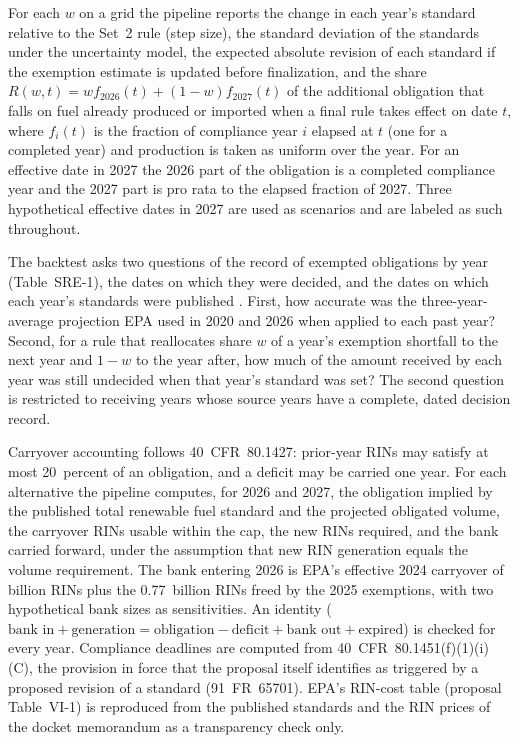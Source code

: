 \documentclass[preprint,12pt,authoryear]{elsarticle}
\begin{document}
For each $w$ on a grid the pipeline reports the change in each year's standard relative to the Set~2 rule (step size), the standard deviation of the standards under the uncertainty model, the expected absolute revision of each standard if the exemption estimate is updated before finalization, and the share $R(w,t) = w f_{2026}(t) + (1-w) f_{2027}(t)$ of the additional obligation that falls on fuel already produced or imported when a final rule takes effect on date $t$, where $f_i(t)$ is the fraction of compliance year $i$ elapsed at $t$ (one for a completed year) and production is taken as uniform over the year. For an effective date in 2027 the 2026 part of the obligation is a completed compliance year and the 2027 part is pro rata to the elapsed fraction of 2027. Three hypothetical effective dates in 2027 are used as scenarios and are labeled as such throughout.

The backtest asks two questions of the record of exempted obligations by year (Table~SRE-1), the dates on which they were decided, and the dates on which each year's standards were published \citep{fr_2020_00431,fr_2022_12376,fr_2023_13462,fr_2026_06275}. First, how accurate was the three-year-average projection EPA used in 2020 and 2026 when applied to each past year? Second, for a rule that reallocates share $w$ of a year's exemption shortfall to the next year and $1-w$ to the year after, how much of the amount received by each year was still undecided when that year's standard was set? The second question is restricted to receiving years whose source years have a complete, dated decision record.

Carryover accounting follows 40~CFR~80.1427: prior-year RINs may satisfy at most 20~percent of an obligation, and a deficit may be carried one year. For each alternative the pipeline computes, for 2026 and 2027, the obligation implied by the published total renewable fuel standard and the projected obligated volume, the carryover RINs usable within the cap, the new RINs required, and the bank carried forward, under the assumption that new RIN generation equals the volume requirement. The bank entering 2026 is EPA's effective 2024 carryover of \valbankRia{} billion RINs \citep{ria_420r26011} plus the 0.77~billion RINs freed by the 2025 exemptions, with two hypothetical bank sizes as sensitivities. An identity ($\text{bank in} + \text{generation} = \text{obligation} - \text{deficit} + \text{bank out} + \text{expired}$) is checked for every year. Compliance deadlines are computed from 40~CFR~80.1451(f)(1)(i)(C), the provision in force that the proposal itself identifies as triggered by a proposed revision of a standard (91~FR~65701). EPA's RIN-cost table (proposal Table~VI-1) is reproduced from the published standards and the RIN prices of the docket memorandum \citep{docket_0961} as a transparency check only.
\end{document}
